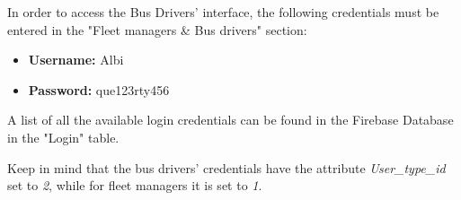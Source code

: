 \documentclass[a4paper, 12pt]{article}
\begin{document}
	In order to access the Bus Drivers' interface, the following credentials must be entered in the "Fleet managers \& Bus drivers" section:
	\begin{itemize}
	       \item \textbf{Username:} Albi
	       \item \textbf{Password:} que123rty456
	\end{itemize}

	A list of all the available login credentials can be found in the Firebase Database in the "Login" table. 
	
	Keep in mind that the bus drivers' credentials have the attribute \textit{User\_type\_id} set to \textit{2}, while for fleet managers it is set to \textit{1}.
\end{document}
